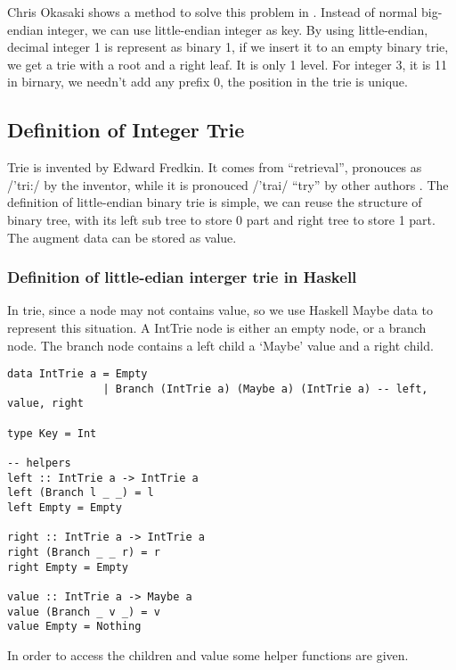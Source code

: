 \documentclass{article}
\begin{document}
Chris Okasaki shows a method to solve this problem in \cite{okasaki-int-map}. Instead of 
normal big-endian integer, we can use little-endian integer as key. By using little-endian,
decimal integer 1 is represent as binary 1, if we insert it to an empty binary trie, we
get a trie with a root and a right leaf. It is only 1 level. For integer 3, it is 11 in 
birnary, we needn't add any prefix 0, the position in the trie is unique.

\subsection{Definition of Integer Trie}
Trie is invented by Edward Fredkin. It comes from ``retrieval'', pronouces 
as /'tri:/ by the inventor, while it is pronouced /'trai/ ``try'' 
by other authors \cite{wiki-trie}.
The definition of little-endian binary trie is simple, we can reuse the structure
of binary tree, with its left sub tree to store 0 part and right tree to store 1 part.
The augment data can be stored as value.

\subsubsection*{Definition of little-edian interger trie in Haskell}
In trie, since a node may not contains value, so we use Haskell Maybe data to represent
this situation. A IntTrie node is either an empty node, or a branch node. The branch
node contains a left child a `Maybe' value and a right child. 

\lstset{language=Haskell}
\begin{lstlisting}
data IntTrie a = Empty 
               | Branch (IntTrie a) (Maybe a) (IntTrie a) -- left, value, right

type Key = Int

-- helpers
left :: IntTrie a -> IntTrie a
left (Branch l _ _) = l
left Empty = Empty

right :: IntTrie a -> IntTrie a
right (Branch _ _ r) = r
right Empty = Empty

value :: IntTrie a -> Maybe a
value (Branch _ v _) = v
value Empty = Nothing
\end{lstlisting}

In order to access the children and value some helper functions are given.
\end{document}
